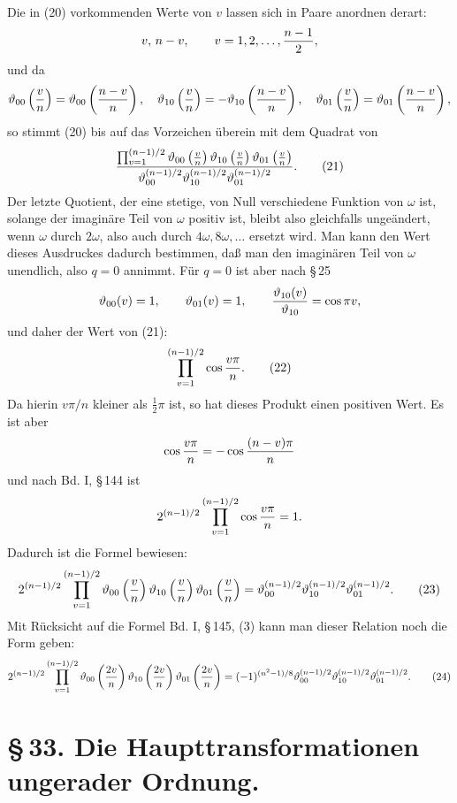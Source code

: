 \documentclass[11pt]{article}
\providecommand{\tht}{\vartheta}
\begin{document}
Die in (20) vorkommenden Werte von $v$ lassen sich in Paare anordnen derart:
\[
v,\,n-v,
\qquad v=1,2,\ldots,{n-1\over2},
\]
und da
\[
\tht_{00}\left({v\over n}\right)=\tht_{00}\left({n-v\over n}\right),\quad
\tht_{10}\left({v\over n}\right)=-\tht_{10}\left({n-v\over n}\right),\quad
\tht_{01}\left({v\over n}\right)=\tht_{01}\left({n-v\over n}\right),
\]
so stimmt (20) bis auf das Vorzeichen überein mit dem Quadrat von
\begin{equation}
{\prod_{v=1}^{(n-1)/2}\tht_{00}\left({v\over n}\right)\tht_{10}\left({v\over n}\right)\tht_{01}\left({v\over n}\right)
\over
\tht_{00}^{(n-1)/2}\tht_{10}^{(n-1)/2}\tht_{01}^{(n-1)/2}}. \tag{21}
\end{equation}
Der letzte Quotient, der eine stetige, von Null verschiedene Funktion von $\omega$ ist, solange der imaginäre Teil von $\omega$ positiv ist, bleibt also gleichfalls ungeändert, wenn $\omega$ durch $2\omega$, also auch durch $4\omega,8\omega,\ldots$ ersetzt wird. Man kann den Wert dieses Ausdruckes dadurch bestimmen, daß man den imaginären Teil von $\omega$ unendlich, also $q=0$ annimmt. Für $q=0$ ist aber nach \S\,25
\[
\tht_{00}(v)=1,
\qquad
\tht_{01}(v)=1,
\qquad
{\tht_{10}(v)\over\tht_{10}}=\cos \pi v,
\]
und daher der Wert von (21):
\begin{equation}
\prod_{v=1}^{(n-1)/2}\cos{v\pi\over n}. \tag{22}
\end{equation}
Da hierin $v\pi/n$ kleiner als $\frac12\pi$ ist, so hat dieses Produkt einen positiven Wert. Es ist aber
\[
\cos {v\pi\over n}=-\cos{(n-v)\pi\over n}
\]
und nach Bd. I, \S\,144 ist
\[
2^{(n-1)/2}\prod_{v=1}^{(n-1)/2}\cos{v\pi\over n}=1.
\]
Dadurch ist die Formel bewiesen:
\begin{equation}
2^{(n-1)/2}\prod_{v=1}^{(n-1)/2}
\tht_{00}\left({v\over n}\right)\tht_{10}\left({v\over n}\right)\tht_{01}\left({v\over n}\right)
=\tht_{00}^{(n-1)/2}\tht_{10}^{(n-1)/2}\tht_{01}^{(n-1)/2}. \tag{23}
\end{equation}
Mit Rücksicht auf die Formel Bd. I, \S\,145, (3) kann man dieser Relation noch die Form geben:
\begin{equation}
2^{(n-1)/2}\prod_{v=1}^{(n-1)/2}
\tht_{00}\left({2v\over n}\right)\tht_{10}\left({2v\over n}\right)\tht_{01}\left({2v\over n}\right)
=(-1)^{(n^2-1)/8}\tht_{00}^{(n-1)/2}\tht_{10}^{(n-1)/2}\tht_{01}^{(n-1)/2}. \tag{24}
\end{equation}

\section*{\S\,33. Die Haupttransformationen ungerader Ordnung.}
\end{document}

